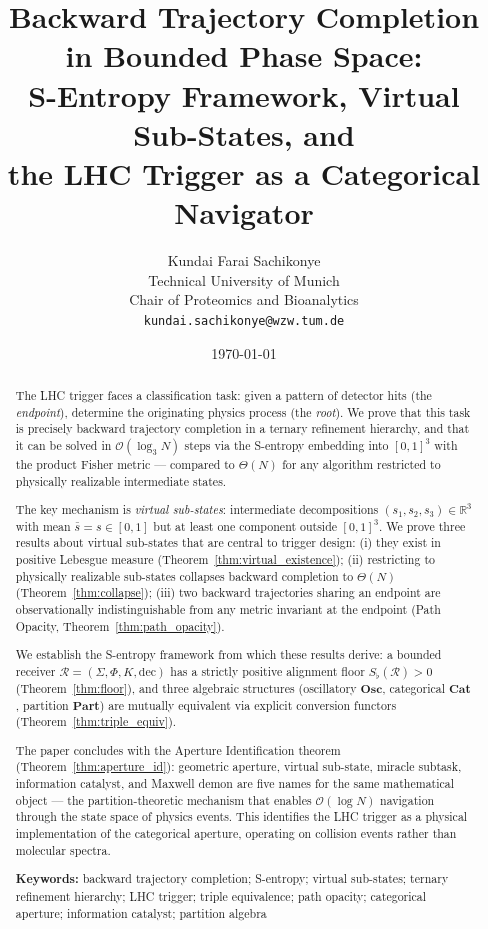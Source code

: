 \documentclass[twocolumn,10pt,a4paper]{article}
\title{\textbf{Backward Trajectory Completion in Bounded Phase Space:\\
S-Entropy Framework, Virtual Sub-States, and\\
the LHC Trigger as a Categorical Navigator}}
\author{
Kundai Farai Sachikonye\\
Technical University of Munich\\
Chair of Proteomics and Bioanalytics\\
\texttt{kundai.sachikonye@wzw.tum.de}
}
\date{\today}
\theoremstyle{thmstyle}
\theoremstyle{definition}
\theoremstyle{remark}
\newcommand{\R}{\mathbb{R}}
\newcommand{\Sfl}{S_{\flat}}
\newcommand{\receiver}{\mathcal{R}}
\newcommand{\Osc}{\mathbf{Osc}}
\newcommand{\Cat}{\mathbf{Cat}}
\newcommand{\Part}{\mathbf{Part}}
\begin{document}
\maketitle

\begin{abstract}
\noindent
The LHC trigger faces a classification task: given a pattern of detector
hits (the \emph{endpoint}), determine the originating physics process (the
\emph{root}). We prove that this task is precisely backward trajectory
completion in a ternary refinement hierarchy, and that it can be solved in
$\mathcal{O}(\log_3 N)$ steps via the S-entropy embedding into $[0,1]^3$
with the product Fisher metric — compared to $\Theta(N)$ for any algorithm
restricted to physically realizable intermediate states.

The key mechanism is \emph{virtual sub-states}: intermediate decompositions
$(s_1, s_2, s_3) \in \R^3$ with mean $\bar s = s \in [0,1]$ but at least
one component outside $[0,1]^3$. We prove three results about virtual
sub-states that are central to trigger design:
(i) they exist in positive Lebesgue measure (Theorem~\ref{thm:virtual_existence});
(ii) restricting to physically realizable sub-states collapses backward
completion to $\Theta(N)$ (Theorem~\ref{thm:collapse});
(iii) two backward trajectories sharing an endpoint are observationally
indistinguishable from any metric invariant at the endpoint (Path Opacity,
Theorem~\ref{thm:path_opacity}).

We establish the S-entropy framework from which these results derive: a
bounded receiver $\receiver = (\Sigma, \Phi, K, \mathrm{dec})$ has a
strictly positive alignment floor $\Sfl(\receiver) > 0$
(Theorem~\ref{thm:floor}), and three algebraic structures
(oscillatory $\Osc$, categorical $\Cat$, partition $\Part$) are mutually
equivalent via explicit conversion functors
(Theorem~\ref{thm:triple_equiv}).

The paper concludes with the Aperture Identification theorem
(Theorem~\ref{thm:aperture_id}): geometric aperture, virtual sub-state,
miracle subtask, information catalyst, and Maxwell demon are five names
for the same mathematical object — the partition-theoretic mechanism
that enables $\mathcal{O}(\log N)$ navigation through the state space
of physics events. This identifies the LHC trigger as a physical
implementation of the categorical aperture, operating on collision events
rather than molecular spectra.

\medskip
\noindent\textbf{Keywords:} backward trajectory completion; S-entropy;
virtual sub-states; ternary refinement hierarchy; LHC trigger; triple
equivalence; path opacity; categorical aperture; information catalyst;
partition algebra
\end{abstract}
\end{document}
